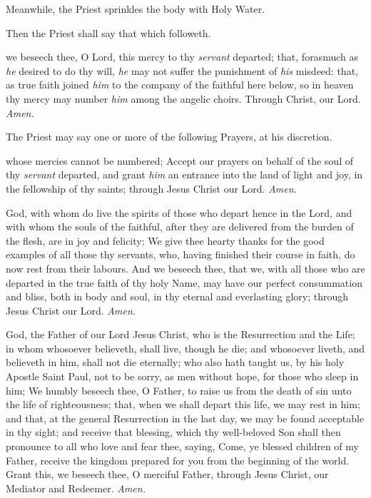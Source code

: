 \begin{rubric}
    Meanwhile, the Priest sprinkles the body with Holy Water.
\end{rubric}
\begin{rubric}
	Then the Priest shall say that which followeth.
\end{rubric}
 we beseech thee, O Lord, this mercy to thy \textit{servant} departed; that, forasmuch as \textit{he} desired to do thy will, \textit{he} may not suffer the punishment of \textit{his} misdeed: that, as true faith joined \textit{him} to the company of the faithful here below, so in heaven thy mercy may number \textit{him} among the angelic choirs. Through Christ, our Lord. \textit{Amen.}
\begin{rubric}
    The Priest may say one or more of the following Prayers, at his discretion.
\end{rubric}\par

 whose mercies cannot be numbered; Accept our prayers on behalf of the soul of thy \textit{servant} departed, and grant \textit{him} an entrance into the land of light and joy, in the fellowship of thy saints; through Jesus Christ our Lord. \textit{Amen.}\par

 God, with whom do live the spirits of those who depart hence in the Lord, and with whom the souls of the faithful, after they are delivered from the burden of the flesh, are in joy and felicity; We give thee hearty thanks for the good examples of all those thy servants, who, having finished their course in faith, do now rest from their labours. And we beseech thee, that we, with all those who are departed in the true faith of thy holy Name, may have our perfect consummation and bliss, both in body and soul, in thy eternal and everlasting glory; through Jesus Christ our Lord. \textit{Amen.}\par

 God, the Father of our Lord Jesus Christ, who is the Resurrection and the Life; in whom whosoever believeth, shall live, though he die; and whosoever liveth, and believeth in him, shall not die eternally; who also hath taught us, by his holy Apostle Saint Paul, not to be sorry, as men without hope, for those who sleep in him; We humbly beseech thee, O Father, to raise us from the death of sin unto the life of righteousness; that, when we shall depart this life, we may rest in him; and that, at the general Resurrection in the last day, we may be found acceptable in thy sight; and receive that blessing, which thy well-beloved Son shall then pronounce to all who love and fear thee, saying, Come, ye blessed children of my Father, receive the kingdom prepared for you from the beginning of the world. Grant this, we beseech thee, O merciful Father, through Jesus Christ, our Mediator and Redeemer. \textit{Amen.}\par

